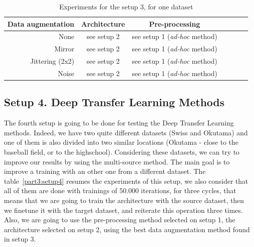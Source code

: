 \begin{table}[ht!]
  \centering
  
  \begin{tabular}{rcccccc}
  \rowcolor{gray!50}
  \toprule
  \textbf{Data augmentation} & \textbf{Architecture} & \textbf{Pre-processing} \\
  \midrule
  None    & see setup 2       & see setup 1 (\textit{ad-hoc} method) \\
  Mirror    & see setup 2       & see setup 1 (\textit{ad-hoc} method) \\
  Jittering (2x2)    & see setup 2       & see setup 1 (\textit{ad-hoc} method) \\
  Noise    & see setup 2       & see setup 1 (\textit{ad-hoc} method) \\
  \bottomrule
  \end{tabular}%
  
  \caption{Experiments for the setup 3, for one dataset}
  \label{part3:setup3}
\end{table}%


\subsection*{Setup 4. Deep Transfer Learning Methods} \label{3:setups:4}
The fourth setup is going to be done for testing the Deep Transfer Learning methods. Indeed, we have two quite different datasets (Swiss and Okutama) and one of them is also divided into two similar locations (Okutama - close to the baseball field, or to the highschool). Considering these datasets, we can try to improve our results by using the multi-source method. The main goal is to improve a training with an other one from a different dataset. The table~\ref{part3:setup4} resumes the experiments of this setup, we also consider that all of them are done with trainings of 50.000 iterations, for three cycles, that means that we are going to train the architecture with the source dataset, then we finetune it with the target dataset, and reiterate this operation three times. Also, we are going to use the pre-processing method selected on setup 1, the architecture selected on setup 2, using the best data augmentation method found in setup 3.

